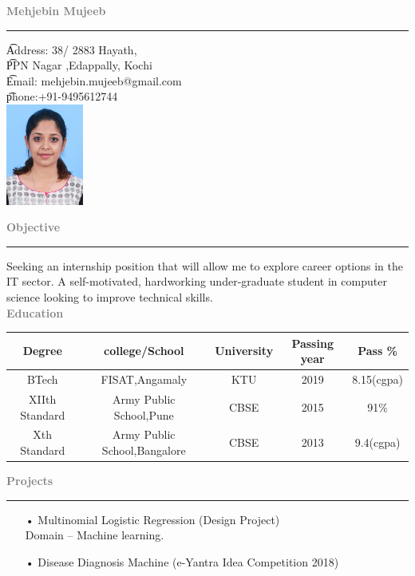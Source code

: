 \documentclass[11.5pt,a4paper]{article}
\begin{document}
\textbf{\textcolor{gray}{\Huge Mehjebin Mujeeb}}\\ \hrule

\t Address: 38/ 2883 Hayath,\\ 
\t PPN Nagar ,Edappally, Kochi\\
\t Email: mehjebin.mujeeb@gmail.com\\
\t phone:+91-9495612744\\
\includegraphics[scale=0.7, width=0.19\textwidth,right ]{pp}



\textbf{\textcolor{gray}{\huge Objective}}\\ \hrule
Seeking an internship position that will allow me to explore career options in the IT sector. A self-motivated, hardworking under-graduate student in computer science looking to improve technical skills.\\

\textbf{\textcolor{gray}{\huge Education}}


\begin{center}
\begin{tabular}{ |c|c|c|c|c| } 
 \hline
 \textbf{\Large Degree} &\textbf{\Large college/School}&\textbf{\Large University} & \textbf{\Large Passing year}& \textbf{\Large Pass \%} \\ \hline
BTech & FISAT,Angamaly & KTU & 2019 & 8.15(cgpa)\\ \hline
XIIth Standard & Army Public School,Pune & CBSE & 2015 & 91\% \\ \hline
Xth Standard & Army Public School,Bangalore & CBSE & 2013 & 9.4(cgpa)\\

 \hline
\end{tabular}
\end{center}

\textbf{\textcolor{gray}{\huge Projects}}\hrule
\begin{itemize}
\item[•] Multinomial Logistic Regression (Design Project)\\
       Domain – Machine learning.
\item[•] Disease Diagnosis Machine (e-Yantra Idea Competition 2018)
\end{itemize}
\end{document}
